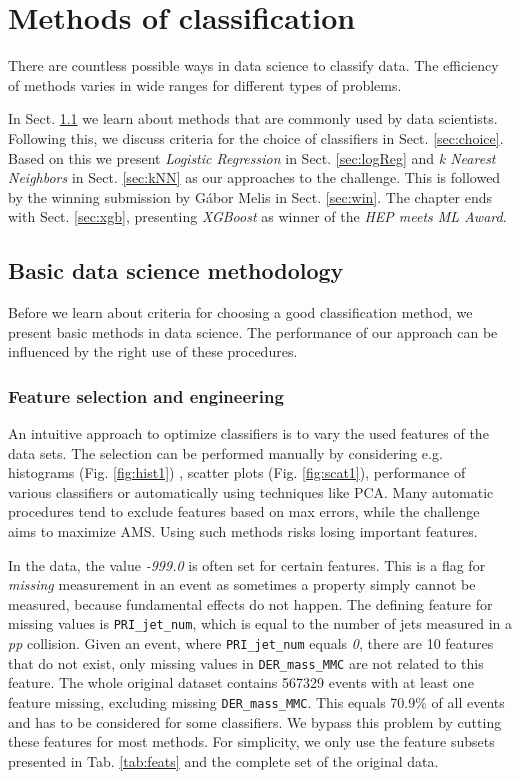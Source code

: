 
\section{Methods of classification}\label{ch:methods}
There are countless possible ways in data science to classify data. The efficiency of methods varies in wide ranges for different types of problems.

In Sect. \ref{sec:basic} we learn about methods that are commonly used by data scientists. Following this, we discuss criteria for the choice of classifiers in Sect. \ref{sec:choice}. Based on this we present \emph{Logistic Regression} in Sect. \ref{sec:logReg} and \emph{k Nearest Neighbors} in Sect. \ref{sec:kNN} as our approaches to the challenge. This is followed by the winning submission by Gábor Melis in Sect. \ref{sec:win}. The chapter ends with Sect. \ref{sec:xgb}, presenting \emph{XGBoost} as winner of the \emph{HEP meets ML Award}.

\subsection{Basic data science methodology}\label{sec:basic}
Before we learn about criteria for choosing a good classification method, we present basic methods in data science. The performance of our approach can be influenced by the right use of these procedures.

\subsubsection{Feature selection and engineering}
An intuitive approach to optimize classifiers is to vary the used features of the data sets. The selection can be performed manually by considering e.g. histograms (Fig. \ref{fig:hist1}) , scatter plots (Fig. \ref{fig:scat1}), performance of various classifiers or automatically using techniques like PCA. Many automatic procedures tend to exclude features based on max errors, while the challenge aims to maximize AMS. Using such methods risks losing important features\cite{blog}.

In the data, the value \emph{-999.0} is often set for certain features. This is a flag for \emph{missing} measurement in an event as sometimes a property simply cannot be measured, because fundamental effects do not happen.
The defining feature for missing values is \texttt{PRI\_jet\_num}, which is equal to the number of jets measured in a \emph{pp} collision. Given an event, where \texttt{PRI\_jet\_num} equals \emph{0}, there are 10 features that do not exist, only missing values in \texttt{DER\_mass\_MMC} are not related to this feature. The whole original dataset contains 567329 events with at least one feature missing, excluding missing \texttt{DER\_mass\_MMC}. This equals 70.9\% of all events and has to be considered for some classifiers. We bypass this problem by cutting these features for most methods. For simplicity, we only use the feature subsets presented in Tab. \ref{tab:feats} and the complete set of the original data.

